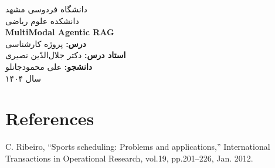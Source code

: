 \documentclass[12pt,a4paper]{article}
\newcommand{\LTRSection}[1]{%
    \LTR\section{\textsf{#1}}
}
\begin{document}
\thispagestyle{empty}
\begin{center}
    \vspace*{2cm}
    \Huge{دانشگاه فردوسی مشهد} \\[0.5cm]
    \Large{دانشکده علوم ریاضی} \\[2cm]
    \Huge{\LTR\textbf{MultiModal Agentic RAG}} \\[2cm]
    \Large{
        \textbf{درس:} پروژه کارشناسی \\
        \textbf{استاد درس:} دکتر جلال‌الدّین نصیری
    } \\[2cm]
    \Large{
        \textbf{دانشجو:} علی محمودجانلو
    } \\[3cm]
    \Large{سال ۱۴۰۴}
\end{center}

\newpage

\thispagestyle{empty}
\hypersetup{linkcolor=blue}
\tableofcontents
\newpage



\newpage


\newpage


\newpage


\newpage
\LTRSection{References}
\begin{thebibliography}{10}
     C. Ribeiro, “Sports scheduling: Problems and applications,” International Transactions in Operational Research, vol.19, pp.201–226, Jan. 2012.
\end{thebibliography}
\end{document}
